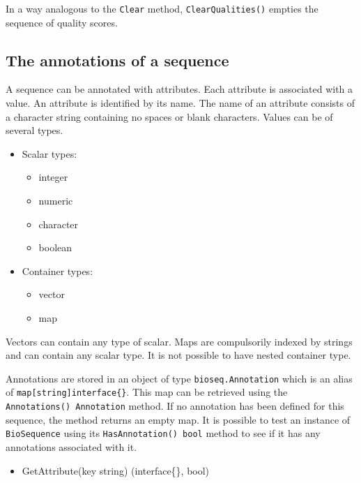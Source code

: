 \documentclass[
  letterpaper,
  DIV=11,
  numbers=noendperiod]{scrreprt}
\providecommand{\tightlist}{%
  \setlength{\itemsep}{0pt}\setlength{\parskip}{0pt}}\usepackage{longtable,booktabs,array}
\begin{document}
In a way analogous to the \texttt{Clear} method,
\texttt{ClearQualities()} empties the sequence of quality scores.

\hypertarget{the-annotations-of-a-sequence}{%
\subsection*{The annotations of a
sequence}\label{the-annotations-of-a-sequence}}

A sequence can be annotated with attributes. Each attribute is
associated with a value. An attribute is identified by its name. The
name of an attribute consists of a character string containing no spaces
or blank characters. Values can be of several types.

\begin{itemize}
\tightlist
\item
  Scalar types:

  \begin{itemize}
  \tightlist
  \item
    integer
  \item
    numeric
  \item
    character
  \item
    boolean
  \end{itemize}
\item
  Container types:

  \begin{itemize}
  \tightlist
  \item
    vector
  \item
    map
  \end{itemize}
\end{itemize}

Vectors can contain any type of scalar. Maps are compulsorily indexed by
strings and can contain any scalar type. It is not possible to have
nested container type.

Annotations are stored in an object of type \texttt{bioseq.Annotation}
which is an alias of \texttt{map{[}string{]}interface\{\}}. This map can
be retrieved using the \texttt{Annotations()\ Annotation} method. If no
annotation has been defined for this sequence, the method returns an
empty map. It is possible to test an instance of \texttt{BioSequence}
using its \texttt{HasAnnotation()\ bool} method to see if it has any
annotations associated with it.

\begin{itemize}
\tightlist
\item
  GetAttribute(key string) (interface\{\}, bool)
\end{itemize}
\end{document}
